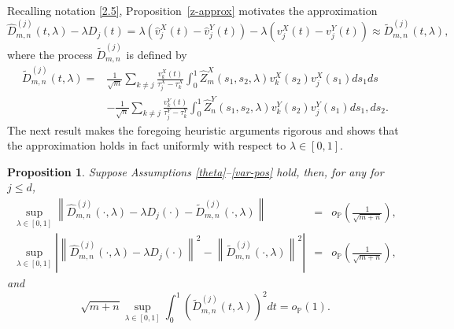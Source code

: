\documentclass[11pt]{article}
\newtheorem{proposition}{Proposition}[section]
\numberwithin{equation}{section}
\numberwithin{theorem}{section}
\numberwithin{lemma}{section}
\numberwithin{proposition}{section}
\numberwithin{cor}{section}
\numberwithin{definition}{section}
\numberwithin{cons}{section}
\numberwithin{rem}{section}
\numberwithin{exa}{section}
\numberwithin{table}{section}
\numberwithin{figure}{section}
\numberwithin{algo}{section}
\begin{document}
{{Recalling notation \eqref{2.5}, Proposition~\ref{z-approx} motivates the approximation
\begin{equation}\label{2.9}
 \hat D_{m,n}^{(j)}(t,\lambda) - \lambda D_j(t)  = \lambda ( \hat v^X_j (t) -  \hat v^Y_j (t) )  - \lambda (v^X_j (t) - v^Y_j (t) )  \approx
  \tilde D_{m,n}^{(j)}(t, \lambda),
\end{equation}
where the process  $  \tilde D_{m,n}^{(j)}$  is defined by
\begin{align}
\nonumber
\tilde D^{(j)}_{m,n} (t, \lambda)
=& \frac {1}{\sqrt{m}} \sum_{k \neq j} \frac {v^X_k (t)}{\tau^X_j - \tau^X_k} \int^1_0 \hat Z^X_m (s_1,s_2,\lambda) v^X_k (s_2) v^X_j (s_1) ds_1 ds\\ \label{2.8}
&- \frac {1}{\sqrt{n}} \sum_{k \neq j} \frac {v^Y_k (t)}{\tau^Y_j - \tau^Y_k} \int^1_0 \hat Z^Y_n (s_1, s_2, \lambda) v^Y_k(s_2) v^Y_j(s_1) ds_1, ds_2.
\end{align}
The next result makes the foregoing heuristic arguments  rigorous and shows that the approximation holds in fact uniformly with respect to $\lambda \in [0,1]$.

\begin{proposition}\label{d-approx-1}
Suppose Assumptions  \ref{theta}--\ref{var-pos} %
hold, then, for any  for $j \le d$,
\begin{eqnarray*}
\sup_{\lambda \in [0,1]} \left\|  \hat D_{m,n}^{(j)}(\cdot,\lambda) - \lambda D_j(\cdot) - \tilde D_{m,n}^{(j)}(\cdot, \lambda)   \right\| & =& o_\mathbb{P}\left(\frac{1}{\sqrt{m+n}}\right),
\\
\sup_{\lambda \in [0,1]} \left| \left\|  \hat D_{m,n}^{(j)}(\cdot,\lambda)-\lambda D_j(\cdot) \right\|^2 -  \left\| \tilde D_{m,n}^{(j)}(\cdot, \lambda)   \right\|^2 \right| &= & o_\mathbb{P}\left(\frac{1}{\sqrt{m+n}}\right),
\end{eqnarray*}
and
\begin{equation}
\label{2.11}
\sqrt{m+n} \sup_{\lambda \in [0,1]} \int^1_0 (\tilde D^{(j)}_{m,n} (t, \lambda))^2 dt  =  o_{\mathbb{P}}(1).
\end{equation}
\end{proposition}



}}
\end{document}
